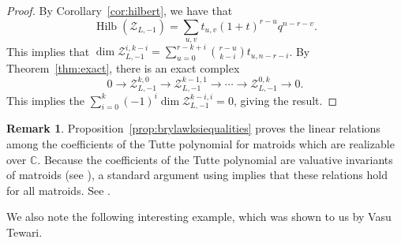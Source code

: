 \documentclass{amsart}
\theoremstyle{definition}
\newtheorem{remark}[theorem]{Remark}
\begin{document}
\begin{proof}
By Corollary~\ref{cor:hilbert}, we have that
$$\operatorname{Hilb}(\mathcal{Z}_{L, -1}) = \sum_{u,v} t_{u,v}(1 + t)^{r - u} q^{n - r - v}.$$
This implies that $\dim \mathcal{Z}_{L, -1}^{i, k-i} =  \sum_{u=0}^{r-k+i} \binom{r-u}{k-i} t_{u, n-r-i}$. By Theorem~\ref{thm:exact}, there is an exact complex
$$0 \to \mathcal{Z}_{L, -1}^{k, 0} \to \mathcal{Z}_{L, -1}^{k-1, 1} \to \dotsb \to \mathcal{Z}_{L, -1}^{0, k} \to 0.$$
This implies the $\sum_{i=0}^{k} (-1)^i \dim \mathcal{Z}_{L, -1}^{k-i, i} = 0$, giving the result. 
\end{proof}



\begin{remark}
Proposition~\ref{prop:brylawksiequalities} proves the linear relations among the coefficients of the Tutte polynomial for matroids which are realizable over $\mathbb{C}$. Because the coefficients of the Tutte polynomial are valuative invariants of matroids (see \cite{DF10}), a standard argument using \cite[Theorem 5.4]{DF10} implies that these relations hold for all matroids. See \cite[Lemma 5.9]{BEST}. 
\end{remark}

We also note the following interesting example, which was shown to us by Vasu Tewari. 
\end{document}
